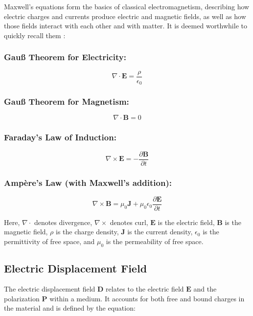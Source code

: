 Maxwell's equations form the basics of classical electromagnetism, describing how electric charges and currents produce electric and magnetic fields, as well as how those fields interact with each other and with matter. It is deemed worthwhile to quickly recall them \cite{maxwell}:

\subsubsection{Gau{\ss} Theorem for Electricity:}
\begin{equation}
\nabla \cdot \mathbf{E} = \frac{\rho}{\epsilon_0}
\end{equation}

\subsubsection{Gau{\ss} Theorem for Magnetism:}
\begin{equation}
\nabla \cdot \mathbf{B} = 0
\end{equation}

\subsubsection{Faraday's Law of Induction:}
\begin{equation}
\nabla \times \mathbf{E} = -\frac{\partial \mathbf{B}}{\partial t}
\end{equation}

\subsubsection{Ampère's Law (with Maxwell's addition):}
\begin{equation}
\nabla \times \mathbf{B} = \mu_0 \mathbf{J} + \mu_0 \epsilon_0 \frac{\partial \mathbf{E}}{\partial t}
\end{equation}

Here, \(\nabla \cdot\) denotes divergence, \(\nabla \times\) denotes curl, \(\mathbf{E}\) is the electric field, \(\mathbf{B}\) is the magnetic field, \(\rho\) is the charge density, \(\mathbf{J}\) is the current density, \(\epsilon_0\) is the permittivity of free space, and \(\mu_0\) is the permeability of free space.
\subsection{Electric Displacement Field}


The electric displacement field \( \mathbf{D} \) relates to the electric field \( \mathbf{E} \) and the polarization \( \mathbf{P} \) within a medium. It accounts for both free and bound charges in the material and is defined by the equation:

